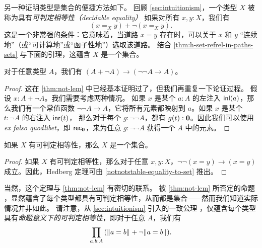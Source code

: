 另一种证明类型是集合的便捷方法如下。
回顾 \cref{sec:intuitionism}，一个类型 $X$ 被称为具有\emph{可判定相等性（decidable equality）}
%
如果对所有 $x, y : X$，我们有
\[(x =_X y) + \neg (x =_X y).\]
%
%
这是一个非常强的条件：它意味着，当道路 $x=y$ 存在时，可以关于 $x$ 和 $y$ ``连续地''（或``可计算地''或``函子性地''）选取该道路。
结合 \cref{thm:h-set-refrel-in-paths-sets} 与下面的引理，这蕴含 $X$ 是一个集合。

\begin{lem}\label{lem:hedberg-helper}
对于任意类型 $A$，我们有 $(A+\neg A)\to(\neg\neg A\to A)$。
\end{lem}

\begin{proof}
这在 \cref{thm:not-lem} 中已经基本证明过了，但我们再重复一下论证过程。
假设 $x:A+\neg A$。我们需要考虑两种情况。
如果 $x$ 是某个 $a:A$ 的左注入 ${\mathsf{inl}}(a)$，那么我们有一个常值函数 $\neg\neg A
\to A$，它将所有元素都映射到 $a$。如果 $x$ 是某个 $t:\neg A$ 的右注入 ${\mathsf{inr}}(t)$，
那么对于每个 $g:\neg\neg A$，都有 $g(t):\mathbf{0}$。因此我们可以使用
\emph{ex falso quodlibet}，即 $\mathsf{rec}_{\mathbf{0}}$，来为任意 $g:\neg\neg A$ 获得一个 $A$ 中的元素。
\end{proof}



\begin{thm}[Hedberg]\label{thm:hedberg}
  如果 $X$ 有可判定相等性，那么 $X$ 是一个集合。
\end{thm}

\begin{proof}
如果 $X$ 有可判定相等性，那么对于任意 $x,y:X$，$\neg\neg(x=y)\to(x=y)$ 成立。因此，Hedberg 定理可由
\cref{notnotstable-equality-to-set} 推出。
\end{proof}

当然，这个定理与 \cref{thm:not-lem} 有密切的联系。
被 \cref{thm:not-lem} 所否定的命题 \LEM{\infty}，显然蕴含了每个类型都具有可判定相等性，从而都是集合——然而我们知道实际情况并非如此。
%
请注意，从 \cref{sec:intuitionism} 引入的一致公理 \LEM{}，仅蕴含每个类型具有\emph{命题意义下的可判定相等性}，即对于任意 $A$，我们有
%
%
\[ \prd{a,b:A} (\brck{a=b} + \neg\brck{a=b}). \]


